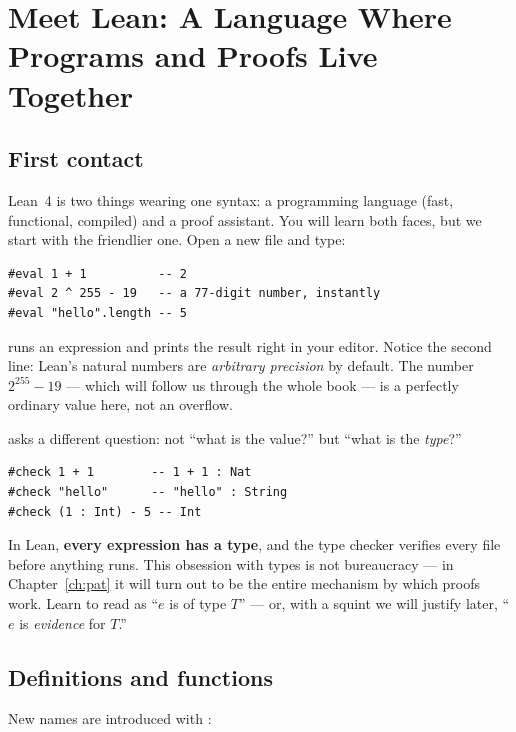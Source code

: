 \chapter{Meet Lean: A Language Where Programs and Proofs Live Together}
\label{ch:lean}

\section{First contact}

Lean~4 is two things wearing one syntax: a programming language (fast,
functional, compiled) and a proof assistant. You will learn both faces, but we
start with the friendlier one. Open a new file  and type:

\begin{lstlisting}[language=Lean]
#eval 1 + 1          -- 2
#eval 2 ^ 255 - 19   -- a 77-digit number, instantly
#eval "hello".length -- 5
\end{lstlisting}

 runs an expression and prints the result right in your editor.
Notice the second line: Lean's natural numbers are \emph{arbitrary precision}
by default. The number $2^{255}-19$ --- which will follow us through the whole
book --- is a perfectly ordinary value here, not an overflow.

 asks a different question: not ``what is the value?'' but
``what is the \emph{type}?''

\begin{lstlisting}[language=Lean]
#check 1 + 1        -- 1 + 1 : Nat
#check "hello"      -- "hello" : String
#check (1 : Int) - 5 -- Int
\end{lstlisting}

\begin{bigidea}
In Lean, \textbf{every expression has a type}, and the type checker verifies
every file before anything runs. This obsession with types is not
bureaucracy --- in Chapter~\ref{ch:pat} it will turn out to be the entire
mechanism by which proofs work. Learn to read  as ``$e$ is of
type $T$'' --- or, with a squint we will justify later, ``$e$ is
\emph{evidence} for $T$.''
\end{bigidea}

\section{Definitions and functions}

New names are introduced with :

